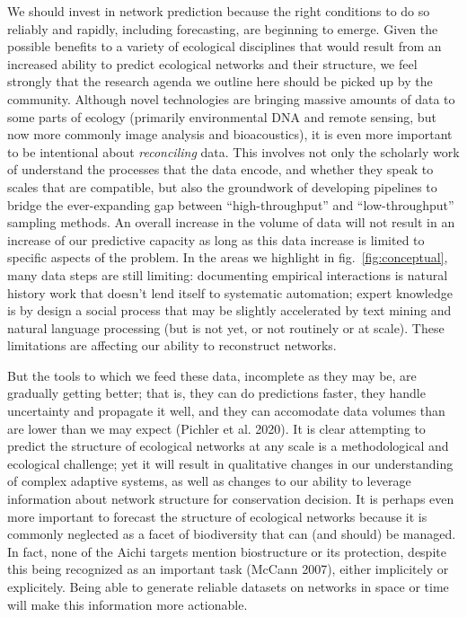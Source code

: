 \documentclass[10pt,oneside]{article}
\begin{document}
We should invest in network prediction because the right conditions to
do so reliably and rapidly, including forecasting, are beginning to
emerge. Given the possible benefits to a variety of ecological
disciplines that would result from an increased ability to predict
ecological networks and their structure, we feel strongly that the
research agenda we outline here should be picked up by the community.
Although novel technologies are bringing massive amounts of data to some
parts of ecology (primarily environmental DNA and remote sensing, but
now more commonly image analysis and bioacoustics), it is even more
important to be intentional about \emph{reconciling} data. This involves
not only the scholarly work of understand the processes that the data
encode, and whether they speak to scales that are compatible, but also
the groundwork of developing pipelines to bridge the ever-expanding gap
between ``high-throughput'' and ``low-throughput'' sampling methods. An
overall increase in the volume of data will not result in an increase of
our predictive capacity as long as this data increase is limited to
specific aspects of the problem. In the areas we highlight in
fig.~\ref{fig:conceptual}, many data steps are still limiting:
documenting empirical interactions is natural history work that doesn't
lend itself to systematic automation; expert knowledge is by design a
social process that may be slightly accelerated by text mining and
natural language processing (but is not yet, or not routinely or at
scale). These limitations are affecting our ability to reconstruct
networks.

But the tools to which we feed these data, incomplete as they may be,
are gradually getting better; that is, they can do predictions faster,
they handle uncertainty and propagate it well, and they can accomodate
data volumes than are lower than we may expect (Pichler et al. 2020). It
is clear attempting to predict the structure of ecological networks at
any scale is a methodological and ecological challenge; yet it will
result in qualitative changes in our understanding of complex adaptive
systems, as well as changes to our ability to leverage information about
network structure for conservation decision. It is perhaps even more
important to forecast the structure of ecological networks because it is
commonly neglected as a facet of biodiversity that can (and should) be
managed. In fact, none of the Aichi targets mention biostructure or its
protection, despite this being recognized as an important task (McCann
2007), either implicitely or explicitely. Being able to generate
reliable datasets on networks in space or time will make this
information more actionable.
\end{document}
